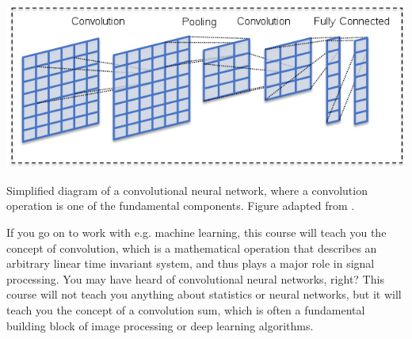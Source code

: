 \begin{marginfigure}[1cm]
\begin{center}
  \includegraphics[width=\textwidth]{ch01/figures/cnn.png}
\end{center}
\caption{Simplified diagram of a convolutional neural network, where a convolution operation is one of the fundamental components. Figure adapted from \citep{maier2019gentle}.}
\label{fig:cnn}
\end{marginfigure}

If you go on to work with e.g. machine learning, this course will teach you the concept of convolution, which is a mathematical operation that describes an arbitrary linear time invariant system, and thus plays a major role in signal processing. You may have heard of convolutional neural networks, right? This course will not teach you anything about statistics or neural networks, but it will teach you the concept of a convolution sum, which is often a fundamental
building block of image processing or deep learning
algorithms\cite{maier2019gentle}.
